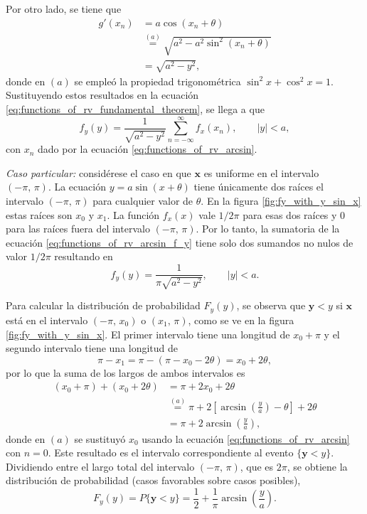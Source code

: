 \documentclass[a4paper]{report}
\newcommand{\x}{\mathbf{x}}
\newcommand{\y}{\mathbf{y}}
\begin{document}
Por otro lado, se tiene que
\begin{align*}
 g'(x_n)&=a\cos(x_n+\theta)\\
        &\overset{(a)}{=}\sqrt{a^2-a^2\sin^2(x_n+\theta)}\\
        &=\sqrt{a^2-y^2},
\end{align*}
donde en \((a)\) se empleó la propiedad trigonométrica \(\sin^2x+\cos^2x=1\).
Sustituyendo estos resultados en la ecuación \ref{eq:functions_of_rv_fundamental_theorem}, se llega a que
\begin{equation}\label{eq:functions_of_rv_arcsin_f_y}
 f_y(y)=\frac{1}{\sqrt{a^2-y^2}}\sum_{n=-\infty}^{\infty}f_x(x_n),\qquad |y|<a,
\end{equation}
con \(x_n\) dado por la ecuación \ref{eq:functions_of_rv_arcsin}.

\emph{Caso particular:} considérese el caso en que \(\x\) es uniforme en el intervalo \((-\pi,\,\pi)\). La ecuación \(y=a\sin(x+\theta)\) tiene únicamente dos raíces el intervalo \((-\pi,\,\pi)\) para cualquier valor de \(\theta\). En la figura \ref{fig:fy_with_y_sin_x} estas raíces son \(x_0\) y \(x_1\). La función \(f_x(x)\) vale \(1/2\pi\) para esas dos raíces y 0 para las raíces fuera del intervalo \((-\pi,\,\pi)\). Por lo tanto, la sumatoria de la ecuación \ref{eq:functions_of_rv_arcsin_f_y} tiene solo dos sumandos no nulos de valor \(1/2\pi\) resultando en
\[
 f_y(y)=\frac{1}{\pi\sqrt{a^2-y^2}},\qquad |y|<a.
\]

Para calcular la distribución de probabilidad \(F_y(y)\), se observa que \(\y<y\) si \(\x\) está en el intervalo \((-\pi,\, x_0)\) o \((x_1,\,\pi)\), como se ve en la figura \ref{fig:fy_with_y_sin_x}. El primer intervalo tiene una longitud de \(x_0+\pi\) y el segundo intervalo tiene una longitud de
\[
 \pi-x_1=\pi-(\pi-x_0-2\theta)=x_0+2\theta,
\]
por lo que la suma de los largos de ambos intervalos es
\begin{align*}
 (x_0+\pi)+(x_0+2\theta)&=\pi+2x_0+2\theta\\
  &\overset{(a)}{=}\pi+2\left[\arcsin\left(\frac{y}{a}\right)-\theta\right]+2\theta\\
  &=\pi+2\arcsin\left(\frac{y}{a}\right),
\end{align*}
donde en \((a)\) se sustituyó \(x_0\) usando la ecuación \ref{eq:functions_of_rv_arcsin} con \(n=0\). Este resultado es el intervalo correspondiente al evento \(\{\y<y\}\). Dividiendo entre el largo total del intervalo \((-\pi,\,\pi)\), que es \(2\pi\), se obtiene la distribución de probabilidad (casos favorables sobre casos posibles),
\[
 F_y(y)=P\{\y<y\}=\frac{1}{2}+\frac{1}{\pi}\arcsin\left(\frac{y}{a}\right).
\]
\end{document}
